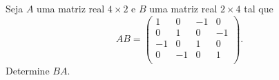 Seja \(A\) uma matriz real \(4\times 2\) e \(B\) uma matriz real \(2\times 4\) tal que
\[ AB = \left(%
\begin{array}{cccc}
  1 & 0 & -1 & 0 \\
  0 & 1 & 0 & -1 \\
  -1 & 0 & 1 & 0 \\
  0 & -1 & 0 & 1 \\
\end{array}%
\right). \]
Determine \(BA\).
